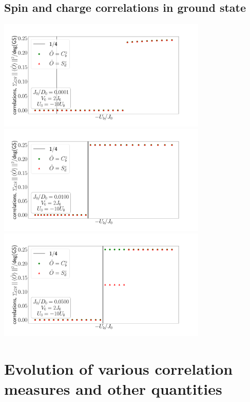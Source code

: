 \documentclass[10pt]{report}
\numberwithin{equation}{section}
\begin{document}
\subsection*{Spin and charge correlations in ground state}
\begin{center}
	\includegraphics[width=0.75\textwidth]{../figures/corrs_gs-J=0.100.pdf}\\
	\includegraphics[width=0.75\textwidth]{../figures/corrs_gs-J=10.000.pdf}\\
	\includegraphics[width=0.75\textwidth]{../figures/corrs_gs-J=50.000.pdf}
\end{center}


\section{Evolution of various correlation measures and other quantities}
\end{document}
